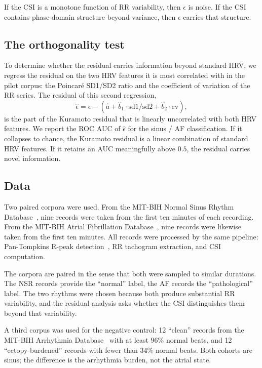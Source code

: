 \documentclass[11pt]{article}
\begin{document}
If the CSI is a monotone function of RR variability, then $\epsilon$ is
noise. If the CSI contains phase-domain structure beyond variance, then
$\epsilon$ carries that structure.

\subsection{The orthogonality test}

To determine whether the residual carries information beyond standard
HRV, we regress the residual on the two HRV features it is most
correlated with in the pilot corpus: the Poincar\'e SD1/SD2 ratio and
the coefficient of variation of the RR series. The residual of this
second regression,
\begin{equation}
\hat{\epsilon} = \epsilon - (\hat{a} + \hat{b}_1 \cdot \mathrm{sd1/sd2}
+ \hat{b}_2 \cdot \mathrm{cv}),
\label{eq:orthogonalized}
\end{equation}
is the part of the Kuramoto residual that is linearly uncorrelated with
both HRV features. We report the ROC AUC of $\hat{\epsilon}$ for the
sinus / AF classification. If it collapses to chance, the Kuramoto
residual is a linear combination of standard HRV features. If it
retains an AUC meaningfully above $0.5$, the residual carries novel
information.

\subsection{Data}

Two paired corpora were used. From the MIT-BIH Normal Sinus Rhythm
Database~\cite{nsrdb}, nine records were taken from the first ten
minutes of each recording. From the MIT-BIH Atrial Fibrillation
Database~\cite{afdb}, nine records were likewise taken from the first
ten minutes. All records were processed by the same pipeline:
Pan-Tompkins R-peak detection~\cite{pan1985}, RR tachogram extraction,
and CSI computation.

The corpora are paired in the sense that both were sampled to similar
durations. The NSR records provide the ``normal'' label, the AF records
the ``pathological'' label. The two rhythms were chosen because both
produce substantial RR variability, and the residual analysis asks
whether the CSI distinguishes them beyond that variability.

A third corpus was used for the negative control: 12 ``clean'' records
from the MIT-BIH Arrhythmia Database~\cite{mitdb} with at least
$96\%$ normal beats, and 12 ``ectopy-burdened'' records with fewer than
$34\%$ normal beats. Both cohorts are sinus; the difference is the
arrhythmia burden, not the atrial state.
\end{document}
